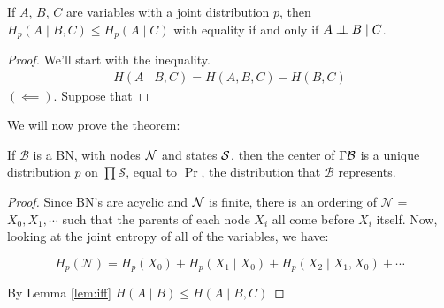 \documentclass{article}
\begin{document}
	\begin{lemma}
		If $A$, $B$, $C$ are variables with a joint distribution $p$, then $H_p(A \mid B, C) \leq H_p(A \mid C)$ with equality if and only if $A \mathrel{\perp\mspace{-10mu}\perp} B \mid C$.
	\end{lemma}
	\begin{proof}
		We'll start with the inequality. 
		\begin{align*}
			H(A \mid B, C) = H(A,B,C) - H(B,C)
		\end{align*}
		$(\impliedby)$. Suppose that 
	\end{proof}
	
	We will now prove the theorem:
	\begin{theorem}
		If $\mathcal B$ is a BN, with nodes $\cal N$ and states $\cal S$, then the center of $\Gamma\cal B$ is a unique distribution $p$ on $\prod \mathcal S$, equal to $\Pr$, the distribution that $\mathcal B$ represents.
	\end{theorem}
	\begin{proof}
		Since BN's are acyclic and $\cal N$ is finite, there is an ordering of $\mathcal N$ = $X_0, X_1, \cdots$ such that the parents of each node $X_i$ all come before $X_i$ itself. Now, looking at the joint entropy of all of the variables, we have:
		
		\[	H_p(\mathcal N) = H_p(X_0) + H_p(X_1 \mid X_0) + H_p(X_2 \mid X_1, X_0) + \cdots \]
		
		By Lemma \ref{lem:iff} $H(A\mid B) \leq H(A \mid B, C)$
	\end{proof}
		
	
\end{document}
